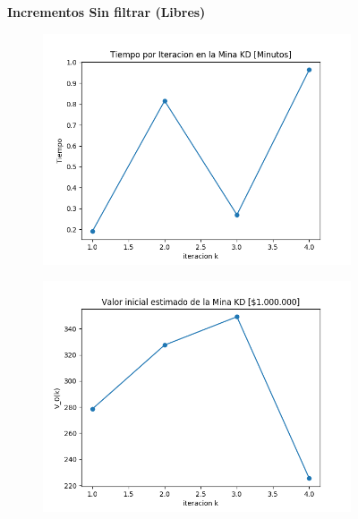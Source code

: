 \documentclass[12pt,letterpaper]{article}
\begin{document}
\begin{figure}[H]
  \captionsetup[subfigure]{labelformat=empty}
  \centering
  \textbf{Incrementos Sin filtrar (Libres)}
  
  \begin{subfigure}[b]{0.4\textwidth}
     \includegraphics[width=\textwidth]{Graficos/sin_filtrar/libre/kd_inc_times.png}
     \caption{}
     \label{fig:ex1}
  \end{subfigure}
  \begin{subfigure}[b]{0.4\textwidth}
     \includegraphics[width=\textwidth]{Graficos/sin_filtrar/libre/kd_inc_v_k.png}
     \caption{}
     \label{fig:ex2}
  \end{subfigure}


\end{figure}
\end{document}
